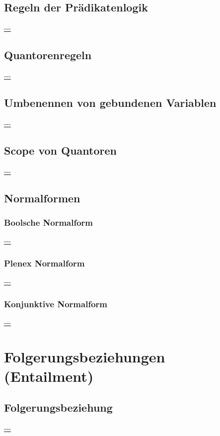 \documentclass[twocolumn]{article}
\begin{document}
    \subsection{Regeln der Prädikatenlogik}
    \url{---}\\

    \subsection{Quantorenregeln}
    \url{---}\\

    \subsection{Umbenennen von gebundenen Variablen}
    \url{---}\\

    \subsection{Scope von Quantoren}
    \url{---}\\

    \subsection{Normalformen}

    \subsubsection{Boolsche Normalform}
    \url{---}\\

    \subsubsection{Plenex Normalform}
    \url{---}\\

    \subsubsection{Konjunktive Normalform}
    \url{---}\\

    \section{Folgerungsbeziehungen (Entailment)}

    \subsection{Folgerungsbeziehung}
    \url{---}\\
\end{document}
